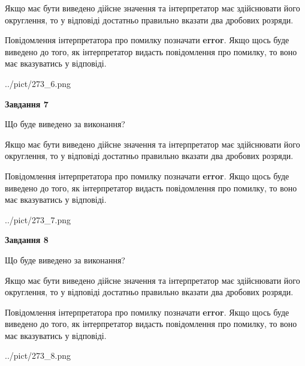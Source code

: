 \documentclass[12pt, ukrainian]{article}
\begin{document}
{\begin {Large}
Якщо має бути виведено дійсне значення та інтерпретатор має здійснювати його округлення, 
то у відповіді достатньо правильно вказати два дробових розряди.

Повідомлення інтерпретатора про помилку позначати \textbf{error}.
Якщо щось буде виведено до того, як інтерпретатор видасть повідомлення про помилку, 
то воно має вказуватись у відповіді. \par

\begin{center}
	{../pict/273_6.png}
\end{center}
\newpage

{\begin {center}\textbf{Завдання 7}\end {center}}\par
Що буде виведено за виконання? \par

Якщо має бути виведено дійсне значення та інтерпретатор має здійснювати його округлення, 
то у відповіді достатньо правильно вказати два дробових розряди.

Повідомлення інтерпретатора про помилку позначати \textbf{error}.
Якщо щось буде виведено до того, як інтерпретатор видасть повідомлення про помилку, 
то воно має вказуватись у відповіді. \par

\begin{center}
	{../pict/273_7.png}
\end{center}
\newpage

{\begin {center}\textbf{Завдання 8}\end {center}}\par
Що буде виведено за виконання? \par

Якщо має бути виведено дійсне значення та інтерпретатор має здійснювати його округлення, 
то у відповіді достатньо правильно вказати два дробових розряди.

Повідомлення інтерпретатора про помилку позначати \textbf{error}.
Якщо щось буде виведено до того, як інтерпретатор видасть повідомлення про помилку, 
то воно має вказуватись у відповіді. \par

\begin{center}
	{../pict/273_8.png}
\end{center}
\newpage


\end{Large}}
\end{document}
